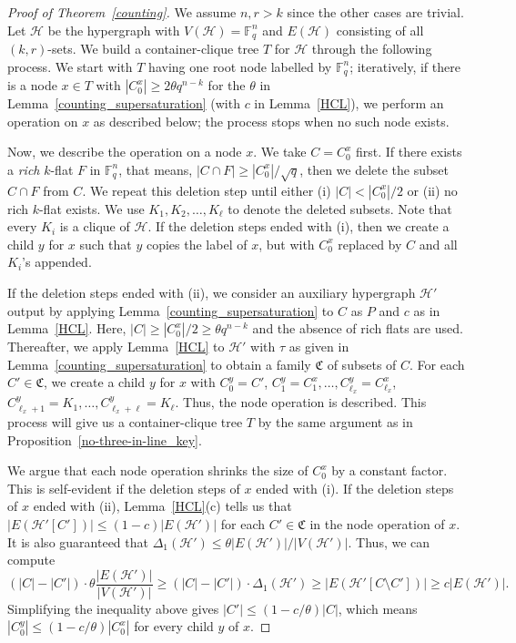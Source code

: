 \documentclass[11pt]{article}
\theoremstyle{definition}
\begin{document}
\begin{proof}[Proof of Theorem~\ref{counting}]

    We assume $n,r > k$ since the other cases are trivial. Let $\mathcal{H}$ be the hypergraph with $V(\mathcal{H}) = \mathbb{F}^n_q$ and $E(\mathcal{H})$ consisting of all $(k,r)$-sets. We build a container-clique tree $T$ for $\mathcal{H}$ through the following process. We start with $T$ having one root node labelled by $\mathbb{F}_q^n$; iteratively, if there is a node $x \in T$ with $|C^x_0| \geq 2\theta q^{n-k}$ for the $\theta$ in Lemma~\ref{counting_supersaturation} (with $c$ in Lemma~\ref{HCL}), we perform an operation on $x$ as described below; the process stops when no such node exists.

    Now, we describe the operation on a node $x$. We take $C = C^x_0$ first. If there exists a \textit{rich} $k$-flat $F$ in $\mathbb{F}_q^n$, that means, $|C \cap F| \geq |C^x_0|/\sqrt{q}$, then we delete the subset $C \cap F$ from $C$. We repeat this deletion step until either (i) $|C| < |C^x_0|/2$ or (ii) no rich $k$-flat exists. We use $K_1,K_2,\dots,K_\ell$ to denote the deleted subsets. Note that every $K_i$ is a clique of $\mathcal{H}$. If the deletion steps ended with (i), then we create a child $y$ for $x$ such that $y$ copies the label of $x$, but with $C^x_0$ replaced by $C$ and all $K_i$'s appended.

    If the deletion steps ended with (ii), we consider an auxiliary hypergraph $\mathcal{H}'$ output by applying Lemma~\ref{counting_supersaturation} to $C$ as $P$ and $c$ as in Lemma~\ref{HCL}. Here, $|C| \geq |C^x_0|/2 \geq \theta q^{n-k}$ and the absence of rich flats are used. Thereafter, we apply Lemma~\ref{HCL} to $\mathcal{H}'$ with $\tau$ as given in Lemma~\ref{counting_supersaturation} to obtain a family $\mathfrak{C}$ of subsets of $C$. For each $C' \in \mathfrak{C}$, we create a child $y$ for $x$ with $C^y_0 = C'$, $C^y_1 = C^x_1, \dots, C^y_{\ell_x}=C^x_{\ell_x}$, $C^y_{\ell_x+1} = K_1,\dots, C^y_{\ell_x+\ell} = K_\ell$. Thus, the node operation is described. This process will give us a container-clique tree $T$ by the same argument as in Proposition~\ref{no-three-in-line_key}.

    We argue that each node operation shrinks the size of $C^x_0$ by a constant factor. This is self-evident if the deletion steps of $x$ ended with (i). If the deletion steps of $x$ ended with (ii), Lemma~\ref{HCL}(c) tells us that $|E(\mathcal{H}'[C'])| \leq (1-c)|E(\mathcal{H}')|$ for each $C' \in \mathfrak{C}$ in the node operation of $x$. It is also guaranteed that $\Delta_1(\mathcal{H}')\leq \theta |E(\mathcal{H}')|/|V(\mathcal{H}')|$. Thus, we can compute \begin{equation*}
        (|C|-|C'|) \cdot \theta\frac{|E(\mathcal{H'})|}{|V(\mathcal{H'})|}\geq(|C|-|C'|)\cdot\Delta_1(\mathcal{H}')\geq|E(\mathcal{H'}[C\setminus C'])|\geq c|E(\mathcal{H}')|.
    \end{equation*} Simplifying the inequality above gives $|C'| \leq (1-c/\theta)|C|$, which means $|C^y_0| \leq (1-c/\theta)|C^x_0|$ for every child $y$ of $x$.


\end{proof}
\end{document}
